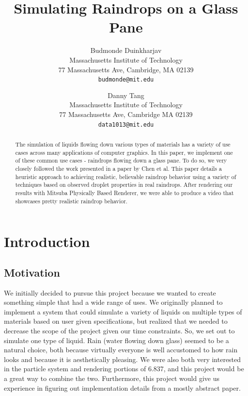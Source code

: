 \documentclass[10pt,twocolumn,letterpaper]{article}
\begin{document}
\title{Simulating Raindrops on a Glass Pane}

\author{Budmonde Duinkharjav\\
Massachusetts Institute of Technology\\
77 Massachusetts Ave, Cambridge, MA 02139\\
{\tt\small budmonde@mit.edu}
\and
Danny Tang\\
Massachusetts Institute of Technology\\
77 Massachusetts Ave, Cambridge MA 02139\\
{\tt\small data1013@mit.edu}
}

\maketitle


\begin{abstract}
    The simulation of liquids flowing down various types of materials has a variety of use cases across many applications of computer graphics. In this paper, we implement one of these common use cases - raindrops flowing down a glass pane. To do so, we very closely followed the work presented in a paper by Chen et al. This paper details a heuristic approach to achieving realistic, believable raindrop behavior using a variety of techniques based on observed droplet properties in real raindrops. After rendering our results with Mitsuba Physically Based Renderer, we were able to produce a video that showcases pretty realistic raindrop behavior.
\end{abstract}

\section{Introduction}
\subsection{Motivation}
We initially decided to pursue this project because we wanted to create something simple that had a wide range of uses. We originally planned to implement a system that could simulate a variety of liquids on multiple types of materials based on user given specifications, but realized that we needed to decrease the scope of the project given our time constraints. So, we set out to simulate one type of liquid. Rain (water flowing down glass) seemed to be a natural choice, both because virtually everyone is well accustomed to how rain looks and because it is aesthetically pleasing. We were also both very interested in the particle system and rendering portions of 6.837, and this project would be a great way to combine the two. Furthermore, this project would give us experience in figuring out implementation details from a mostly abstract paper.
\end{document}
